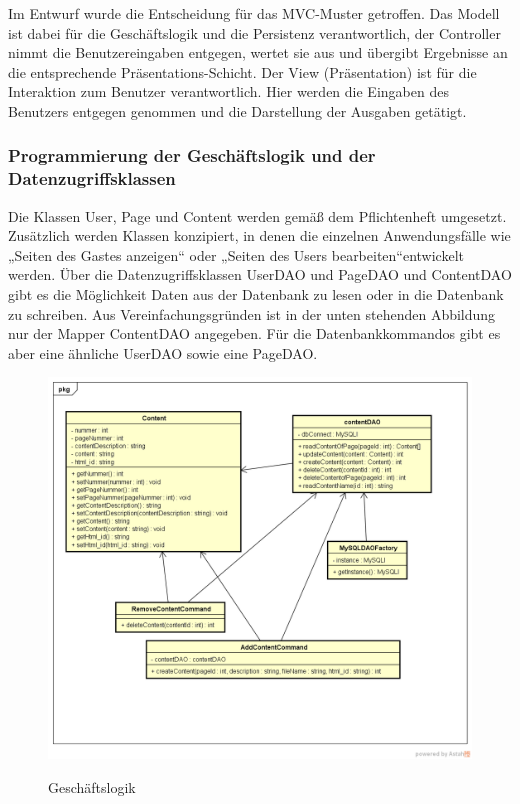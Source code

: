\documentclass[10.5pt]{scrarticle}
\begin{document}
Im Entwurf wurde die Entscheidung für das MVC-Muster getroffen. Das Modell ist dabei für die Geschäftslogik und die Persistenz verantwortlich, der Controller nimmt die Benutzereingaben entgegen, wertet sie aus und übergibt Ergebnisse an die entsprechende Präsentations-Schicht. Der View (Präsentation) ist für die Interaktion zum Benutzer verantwortlich. Hier werden die Eingaben des Benutzers entgegen genommen und die Darstellung der Ausgaben getätigt.

\subsubsection{Programmierung der Geschäftslogik und der Datenzugriffsklassen}

Die Klassen User, Page und Content werden gemä{\ss} dem Pflichtenheft umgesetzt. Zusätzlich werden Klassen konzipiert, in denen die einzelnen Anwendungsfälle wie „Seiten des Gastes anzeigen“ oder „Seiten des Users bearbeiten“entwickelt werden.
Über die Datenzugriffsklassen UserDAO und PageDAO und ContentDAO gibt es die Möglichkeit Daten aus der Datenbank zu lesen oder in die Datenbank zu schreiben. Aus Vereinfachungsgründen ist in der unten stehenden Abbildung nur der Mapper ContentDAO angegeben. Für die Datenbankkommandos gibt es aber eine ähnliche UserDAO sowie eine PageDAO.

\begin{figure}[h!]
\caption{Geschäftslogik}
\includegraphics[scale=0.52]{GeschäftsLogik1}
\label{fig:GeschäftsLogik}
\end{figure}
\end{document}
